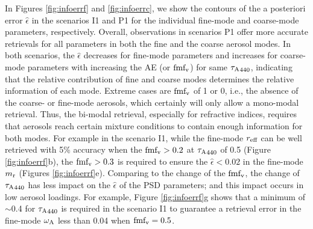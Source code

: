 In Figures \ref{fig:infoerrf} and \ref{fig:infoerrc}, we show the contours of
the a posteriori error $\hat\epsilon$ in the scenarios I1 and P1 for the 
individual fine-mode and coarse-mode parameters, respectively. Overall, 
observations in scenarios P1 offer more accurate retrievals for all parameters
in both the fine and the coarse aerosol modes. In both scenarios, the
$\hat\epsilon$ decreases for fine-mode parameters and increases for 
coarse-mode parameters with increasing the AE (or $\text{fmf}_\text{v}$) for same
${\tau_\text{A}}_{440}$, indicating that the relative contribution
of fine and coarse modes determines the relative information of each
mode. Extreme cases are $\text{fmf}_\text{v}$ of 1 or 0, i.e., the absence of the
coarse- or fine-mode aerosols, which certainly will only allow a
mono-modal retrieval. Thus, the bi-modal retrieval, especially for
refractive indices, requires that aerosols reach certain mixture
conditions to contain enough information for both modes. For example in
the scenario I1, while the fine-mode $r_\text{eff}$ can be well retrieved with 5\%
accuracy when the $\text{fmf}_\text{v}>0.2$ at ${\tau_\text{A}}_{440}$ of 0.5 (Figure
\ref{fig:infoerrf}b), the $\text{fmf}_\text{v}>0.3$ is required to ensure the
$\hat\epsilon<0.02$ in the fine-mode $m_\text{r}$ (Figures
\ref{fig:infoerrf}e). Comparing to the change of the $\text{fmf}_\text{v}$, the change of
${\tau_\text{A}}_{440}$ has less impact on the $\hat\epsilon$ of the PSD parameters;
and this impact occurs in low aerosol loadings. For example, Figure
\ref{fig:infoerrf}g shows that a minimum of $\sim$0.4
for ${\tau_\text{A}}_{440}$ is required in the scenario I1 to guarantee a retrieval
error in the fine-mode $\omega_\text{A}$ less than 0.04 when $\text{fmf}_\text{v}=0.5$. 

